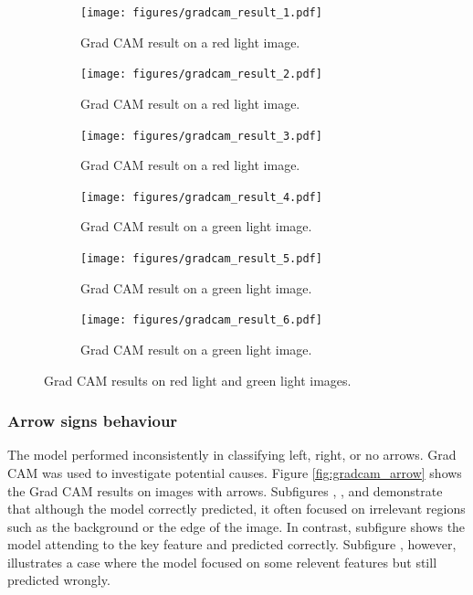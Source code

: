 \documentclass{article}
\begin{document}
\begin{figure}[h]
  \centering

  \begin{subfigure}[t]{0.3\textwidth}
    \centering
    \texttt{[image: figures/gradcam\_result\_1.pdf]}
    \caption{Grad CAM result on a red light image.}
    \label{fig:gradcam_result_1}
  \end{subfigure}
  \hfill
  \begin{subfigure}[t]{0.3\textwidth}
    \centering
    \texttt{[image: figures/gradcam\_result\_2.pdf]}
    \caption{Grad CAM result on a red light image.}
    \label{fig:gradcam_result_2}
  \end{subfigure}
  \hfill
  \begin{subfigure}[t]{0.3\textwidth}
    \centering
    \texttt{[image: figures/gradcam\_result\_3.pdf]}
    \caption{Grad CAM result on a red light image.}
    \label{fig:gradcam_result_3}
  \end{subfigure}

  \vspace{1em} %

  \begin{subfigure}[t]{0.3\textwidth}
    \centering
    \texttt{[image: figures/gradcam\_result\_4.pdf]}
    \caption{Grad CAM result on a green light image.}
    \label{fig:gradcam_result_4}
  \end{subfigure}
  \hfill
  \begin{subfigure}[t]{0.3\textwidth}
    \centering
    \texttt{[image: figures/gradcam\_result\_5.pdf]}
    \caption{Grad CAM result on a green light image.}
    \label{fig:gradcam_result_5}
  \end{subfigure}
  \hfill
  \begin{subfigure}[t]{0.3\textwidth}
    \centering
    \texttt{[image: figures/gradcam\_result\_6.pdf]}
    \caption{Grad CAM result on a green light image.}
    \label{fig:gradcam_result_6}
  \end{subfigure}

  \caption{Grad CAM results on red light and green light images.}
  \label{fig:gradcam_result}
\end{figure}


\subsubsection{Arrow signs behaviour}

The model performed inconsistently in classifying left, right, or no arrows. Grad CAM was used to investigate potential causes. Figure \ref{fig:gradcam_arrow} shows the Grad CAM results on images with arrows. Subfigures , ,  and  demonstrate that although the model correctly predicted, it often focused on irrelevant regions such as the background or the edge of the image. In contrast, subfigure  shows the model attending to the key feature and predicted correctly. Subfigure , however, illustrates a case where the model focused on some relevent features but still predicted wrongly.
\end{document}
